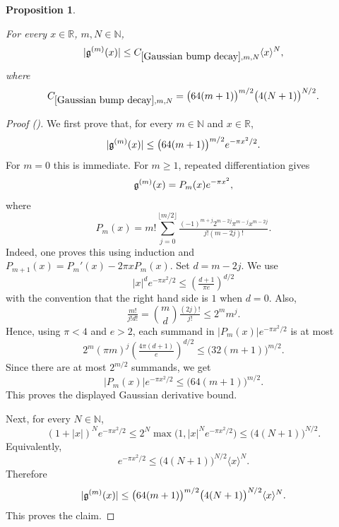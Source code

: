 \documentclass[12pt,reqno]{amsart}
\newcommand{\auto}{{({\tiny\faCar})}}
\theoremstyle{plain}
\newtheorem{proposition}[theorem]{Proposition}
\numberwithin{equation}{section}
\theoremstyle{remark}
\newcommand{\uses}[1]{}
\newcommand{\usesdefs}[1]{}
\newcommand{\leanok}{}
\newcommand{\lean}[1]{}
\newcommand{\R}{{\mathbb R}}
\newcommand{\N}{{\mathbb N}}
\begin{document}
\begin{proposition}\label{Gaussian bump decay}\uses{}\usesdefs{gaussian,bracket bump}
\lean{Auto.gaussianBumpDecay}
\leanok
For every $x\in\R$, $m,N\in\N$,
\begin{equation}\label{auto:Gaussian-derivative-decay} |\mathfrak{g}^{(m)}(x)|\le C_{\ref{Gaussian bump decay},m,N} \langle x\rangle^N, \end{equation}
where
\begin{equation}\label{auto:Gaussian-bump-decay-constant}
C_{\ref{Gaussian bump decay},m,N}
=\bigl(64(m+1)\bigr)^{m/2}\bigl(4(N+1)\bigr)^{N/2}.
\end{equation}

\end{proposition}
\begin{proof}[Proof \auto]
We first prove that, for every $m\in\N$ and $x\in\R$,
\[
|\mathfrak{g}^{(m)}(x)|
\le
\bigl(64(m+1)\bigr)^{m/2}e^{-\pi x^2/2}.
\]
For $m=0$ this is immediate. For $m\ge 1$, repeated differentiation gives
\[
\mathfrak{g}^{(m)}(x)=P_m(x)e^{-\pi x^2},
\]
where
\[
P_m(x)
=
m!\sum_{j=0}^{\lfloor m/2\rfloor}
\tfrac{(-1)^{m+j}2^{m-2j}\pi^{m-j}x^{m-2j}}
{j!(m-2j)!}.
\]
Indeed, one proves this using induction and
$P_{m+1}(x)=P_m'(x)-2\pi xP_m(x).$
Set $d=m-2j$. We use
\[
|x|^d e^{-\pi x^2/2}
\le
\left(\tfrac{d+1}{\pi e}\right)^{d/2}
\]
with the convention that the right hand side is $1$ when $d=0$.
Also,
\[
\tfrac{m!}{j!d!}
=
\binom{m}{d}\tfrac{(2j)!}{j!}
\le
2^m m^j .
\]
Hence, using $\pi<4$ and $e>2$, each summand in $|P_m(x)|e^{-\pi x^2/2}$ is at most
\[
2^m(\pi m)^j
\left(\tfrac{4\pi(d+1)}{e}\right)^{d/2}
\le
\bigl(32(m+1)\bigr)^{m/2}.
\]
Since there are at most $2^{m/2}$ summands, we get
\[
|P_m(x)|e^{-\pi x^2/2}
\le
\bigl(64(m+1)\bigr)^{m/2}.
\]
This proves the displayed Gaussian derivative bound.

Next, for every $N\in\N$,
\[
(1+|x|)^N e^{-\pi x^2/2}
\le
2^N\max\bigl(1,|x|^Ne^{-\pi x^2/2}\bigr)
\le
\bigl(4(N+1)\bigr)^{N/2}.
\]
Equivalently,
\[
e^{-\pi x^2/2}
\le
\bigl(4(N+1)\bigr)^{N/2}\langle x\rangle^N .
\]
Therefore
\[
|\mathfrak{g}^{(m)}(x)|
\le
\bigl(64(m+1)\bigr)^{m/2}
\bigl(4(N+1)\bigr)^{N/2}
\langle x\rangle^N.
\]
This proves the claim.
\end{proof}
\end{document}
